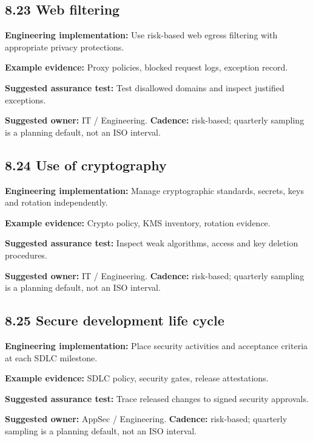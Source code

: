\documentclass[11pt,letterpaper]{article}
\begin{document}
\subsection{8.23 Web filtering}
\textbf{Engineering implementation:} Use risk-based web egress filtering with appropriate privacy protections.\par
\textbf{Example evidence:} Proxy policies, blocked request logs, exception record.\par
\textbf{Suggested assurance test:} Test disallowed domains and inspect justified exceptions.\par
\textbf{Suggested owner:} IT / Engineering. \textbf{Cadence:} risk-based; quarterly sampling is a planning default, not an ISO interval.\par
{}
\subsection{8.24 Use of cryptography}
\textbf{Engineering implementation:} Manage cryptographic standards, secrets, keys and rotation independently.\par
\textbf{Example evidence:} Crypto policy, KMS inventory, rotation evidence.\par
\textbf{Suggested assurance test:} Inspect weak algorithms, access and key deletion procedures.\par
\textbf{Suggested owner:} IT / Engineering. \textbf{Cadence:} risk-based; quarterly sampling is a planning default, not an ISO interval.\par
{}
\subsection{8.25 Secure development life cycle}
\textbf{Engineering implementation:} Place security activities and acceptance criteria at each SDLC milestone.\par
\textbf{Example evidence:} SDLC policy, security gates, release attestations.\par
\textbf{Suggested assurance test:} Trace released changes to signed security approvals.\par
\textbf{Suggested owner:} AppSec / Engineering. \textbf{Cadence:} risk-based; quarterly sampling is a planning default, not an ISO interval.\par
{}
\end{document}
